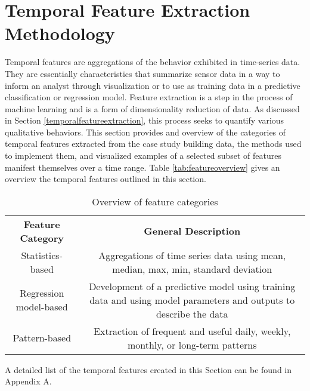 \section{Temporal Feature Extraction Methodology}
\label{sec:featureextraction}

Temporal features are aggregations of the behavior exhibited in time-series data. They are essentially characteristics that summarize sensor data in a way to inform an analyst through visualization or to use as training data in a predictive classification or regression model. Feature extraction is a step in the process of machine learning and is a form of dimensionality reduction of data. As discussed in Section \ref{temporalfeatureextraction}, this process seeks to quantify various qualitative behaviors. This section provides and overview of the categories of temporal features extracted from the case study building data, the methods used to implement them, and visualized examples of a selected subset of features manifest themselves over a time range. Table \ref{tab:featureoverview} gives an overview the temporal features outlined in this section.

\begin{table} 
    \begin{tabular}{ c c }
        \textbf{Feature Category} &  \textbf{General Description}\\ 
        Statistics-based & Aggregations of time series data using mean, median, max, min, standard deviation \\ 
        Regression model-based & Development of a predictive model using training data and using model parameters and outputs to describe the data \\ 
        Pattern-based &  Extraction of frequent and useful daily, weekly, monthly, or long-term patterns\\ 
    \end{tabular} 
    \caption{Overview of feature categories}
\end{table}
\label{tab:featureoverview}

 A detailed list of the temporal features created in this Section can be found in Appendix A. 
